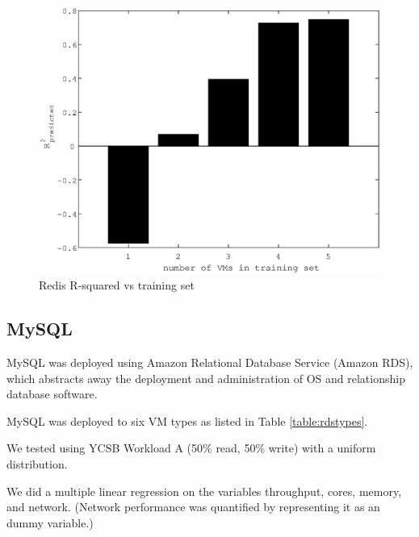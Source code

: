 \documentclass{acm_proc_article-sp}
\begin{document}
\begin{figure}
\centering
\includegraphics[scale = 0.5]{redis_write_bar.eps}
\caption{Redis R-squared vs training set}
\label{figure:redisbarwrite}
\end{figure}



\subsection{MySQL}

MySQL was deployed using Amazon Relational Database Service (Amazon RDS), which abstracts away the deployment and administration of OS and relationship database software.

MySQL was deployed to six VM types as listed in Table \ref{table:rdstypes}.

We tested using YCSB Workload A (50\% read, 50\% write) with a uniform distribution.

We did a multiple linear regression on the variables throughput, cores, memory, and network.  (Network performance was quantified by representing it as an dummy variable.)
\end{document}
